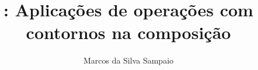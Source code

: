 \documentclass[12pt,brazil]{report}
\title{\obra{}: Aplicações de operações com contornos na composição}
\author{Marcos da Silva Sampaio}
\begin{document}
\graphicspath{{lily/}{figs/}{data/}}

\maketitle
\tableofcontents
\listoftables
\listoffigures





% 

\end{document}
